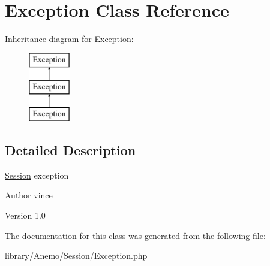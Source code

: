 \hypertarget{class_anemo_1_1_session_1_1_exception}{
\section{Exception Class Reference}
\label{class_anemo_1_1_session_1_1_exception}
}
Inheritance diagram for Exception:\begin{figure}[H]
\begin{center}
\leavevmode
\includegraphics[height=3.000000cm]{class_anemo_1_1_session_1_1_exception}
\end{center}
\end{figure}


\subsection{Detailed Description}
\hyperlink{class_anemo_1_1_session}{Session} exception \begin{DoxyAuthor}{Author}
vince 
\end{DoxyAuthor}
\begin{DoxyVersion}{Version}
1.0 
\end{DoxyVersion}


The documentation for this class was generated from the following file:\begin{DoxyCompactItemize}
\item 
library/Anemo/Session/Exception.php\end{DoxyCompactItemize}
